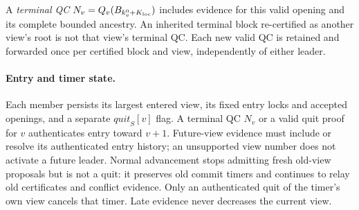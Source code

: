 \documentclass[11pt,a4paper,onecolumn]{article}
\begin{document}
A \emph{terminal QC} $N_v=Q_v(B_{k_v^0+K_{\rm loc}})$ includes evidence for
this valid opening and its complete bounded ancestry. An inherited terminal
block re-certified as another view's root is not that view's terminal QC.
Each new valid QC is retained and forwarded once per certified block and
view, independently of either leader.

\paragraph{Entry and timer state.}
Each member persists its largest entered view, its fixed entry locks and
accepted openings, and a separate $\mathit{quit}_S[v]$ flag. A terminal QC
$N_v$ or a valid quit proof for $v$ authenticates entry toward $v+1$.
Future-view evidence must include or resolve its authenticated entry history;
an unsupported view number does not activate a future leader. Normal
advancement stops admitting fresh old-view proposals but is not a quit:
it preserves old commit timers and continues to relay old certificates and
conflict evidence. Only an authenticated quit of the timer's own view cancels
that timer. Late evidence never decreases the current view.
\end{document}
